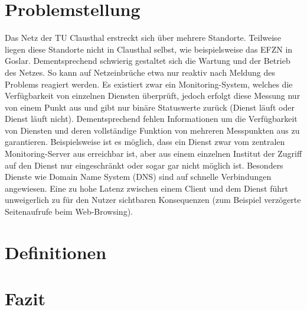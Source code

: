 \documentclass[titlepage]{report}
\begin{document}
\chapter*{Problemstellung}
Das Netz der TU Clausthal erstreckt sich über mehrere
Standorte. Teilweise liegen diese Standorte nicht in Clausthal
selbst, wie beispielsweise das EFZN in Goslar. Dementsprechend
schwierig gestaltet sich die Wartung und der Betrieb
des Netzes. So kann auf Netzeinbrüche etwa nur reaktiv
nach Meldung des Problems reagiert werden. Es existiert
zwar ein Monitoring-System, welches die Verfügbarkeit von
einzelnen Diensten überprüft, jedoch erfolgt diese Messung
nur von einem Punkt aus und gibt nur binäre Statuswerte
zurück (Dienst läuft oder Dienst läuft nicht). Dementsprechend
fehlen Informationen um die Verfügbarkeit von Diensten und
deren vollständige Funktion von mehreren Messpunkten aus
zu garantieren. Beispielsweise ist es möglich, dass ein Dienst
zwar vom zentralen Monitoring-Server aus erreichbar ist, aber
aus einem einzelnen Institut der Zugriff auf den Dienst nur
eingeschränkt oder sogar gar nicht möglich ist. Besonders
Dienste wie Domain Name System (DNS) sind auf schnelle
Verbindungen angewiesen. Eine zu hohe Latenz zwischen
einem Client und dem Dienst führt unweigerlich zu für den
Nutzer sichtbaren Konsequenzen (zum Beispiel verzögerte
Seitenaufrufe beim Web-Browsing).
\chapter*{Definitionen}
\chapter*{Fazit}
\nocite{*}
\printbibliography{}
\listoffigures
\end{document}
